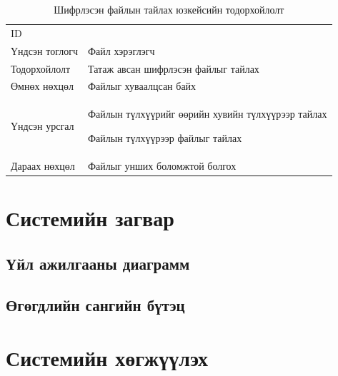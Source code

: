 \begin{table}
    \label{tab:treatments}
    \footnotesize
    \centering
    \begin{tabularx}{\textwidth}{|>{\hsize=0.3\hsize}X|>{\hsize=0.7\hsize}X|}
        \hline
        \multicolumn{2}{|c|}{Шифрлэсэн файлын тайлах} \\
        \hline
        ID & 7 \\
        \hline
        Үндсэн тоглогч & Файл хэрэглэгч\\
        \hline
        Тодорхойлолт & Татаж авсан шифрлэсэн файлыг тайлах\\
        \hline
        Өмнөх нөхцөл & Файлыг хуваалцсан байх\\
        \hline
        Үндсэн урсгал & 
        \item Файлын түлхүүрийг өөрийн хувийн түлхүүрээр тайлах
        \item Файлын түлхүүрээр файлыг тайлах\\
        \hline
        Дараах нөхцөл & Файлыг унших боломжтой болгох\\
        \hline
    \end{tabularx}
    \caption{Шифрлэсэн файлын тайлах юзкейсийн тодорхойлолт}
\end{table}

\section{Системийн загвар}

\subsection*{Үйл ажилгааны диаграмм}

\subsection*{Өгөгдлийн сангийн бүтэц}

\section{Системийн хөгжүүлэх}


